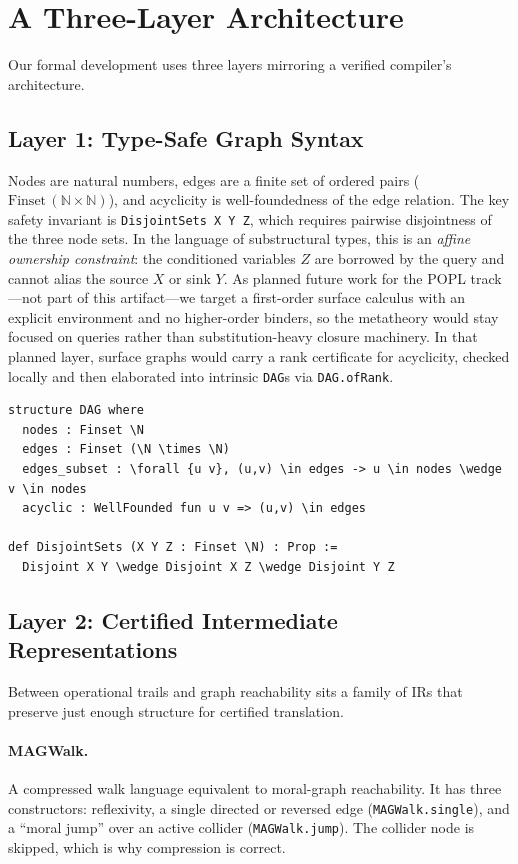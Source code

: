 \documentclass[acmsmall,screen,nonacm]{acmart}
\newcommand{\lean}[1]{\lstinline!#1!}
\newcommand{\N}{\mathbb{N}}
\begin{document}
\section{A Three-Layer Architecture}\label{sec:architecture}

Our formal development uses three layers mirroring a verified compiler's architecture.

\subsection{Layer 1: Type-Safe Graph Syntax}

Nodes are natural numbers, edges are a finite set of ordered pairs
($\mathrm{Finset}\,(\N \times \N)$), and acyclicity is well-foundedness of the
edge relation.  The key safety invariant is
\lean{DisjointSets X Y Z}, which requires pairwise disjointness of the three
node sets.  In the language of substructural types, this is an \emph{affine
ownership constraint}: the conditioned variables $Z$ are borrowed by the query
and cannot alias the source $X$ or sink $Y$.
As planned future work for the POPL track---not part of this artifact---we
target a first-order surface calculus with an explicit environment and no
higher-order binders, so the metatheory would stay focused on queries rather
than substitution-heavy closure machinery.  In that planned layer, surface
graphs would carry a rank certificate for acyclicity, checked locally and then
elaborated into intrinsic \lean{DAG}s via \lean{DAG.ofRank}.

\begin{lstlisting}[caption={DAG structure and safety predicate}]
structure DAG where
  nodes : Finset \N
  edges : Finset (\N \times \N)
  edges_subset : \forall {u v}, (u,v) \in edges -> u \in nodes \wedge v \in nodes
  acyclic : WellFounded fun u v => (u,v) \in edges

def DisjointSets (X Y Z : Finset \N) : Prop :=
  Disjoint X Y \wedge Disjoint X Z \wedge Disjoint Y Z
\end{lstlisting}

\subsection{Layer 2: Certified Intermediate Representations}

Between operational trails and graph reachability sits a family of IRs that
preserve just enough structure for certified translation.

\paragraph{MAGWalk.} A compressed walk language equivalent to moral-graph
reachability.  It has three constructors: reflexivity, a single directed or
reversed edge (\lean{MAGWalk.single}), and a ``moral jump'' over an active
collider (\lean{MAGWalk.jump}).  The collider node is skipped, which is why
compression is correct.
\end{document}
